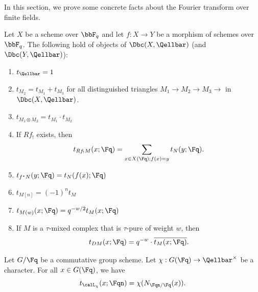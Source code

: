 In this section, we prove some concrete facts about the Fourier transform  over finite fields.


\begin{proposition} \label{proposition:delignes_dictionary_of_trace_functions}
    Let $X$ be a scheme over $\bbF_q$ and let $f: X \to Y$ be a morphism of schemes over $\bbF_q$. The following hold of objects of $\Dbc(X, \Qellbar)$ (and $\Dbc(Y,\Qellbar)$):
    \begin{enumerate}
        \item $t_{\Qellbar} = 1$
        \item $t_{M_2} = t_{M_1} + t_{M_3}$ for all distinguished triangles $M_1 \to M_2 \to M_3 \to$ in $\Dbc(X, \Qellbar)$.
        \item $t_{M_1 \otimes M_2} = t_{M_1} \cdot t_{M_2}$
        \item If $Rf_!$ exists, then 
        $$t_{Rf_! M}(x;\Fq) = \sum_{x \in X(\Fq); f(x) = y} t_{N}(y;\Fq).$$
        \item $t_{f^*N}(y;\Fq) = t_{N}(f(x); \Fq)$
        \item $t_{M[n]} = (-1)^n t_M$
        \item $t_{M(w)}(x;\Fq) = q^{-w/2} t_M(x;\Fq)$
        \item If $M$ is a $\tau$-mixed complex that is $\tau$-pure of weight $w$, then 
        $$t_{DM}(x;\Fq) = q^{-w} \cdot \overline{t_{M}(x;\Fq)}.$$
    \end{enumerate}
\end{proposition}

\begin{proposition} \label{proposition:trace_of_frobenius_of_kummer_sheaf_of_a_character}
    Let $G/\Fq$ be a commutative group scheme. Let $\chi: G(\Fq) \to \Qellbar^\times$ be a character. For all $x \in G(\Fq)$, we have 
    $$t_{\calL_\chi}(x;\Fqn) = \chi(N_{\Fqn/\Fq} (x)).$$
\end{proposition}

